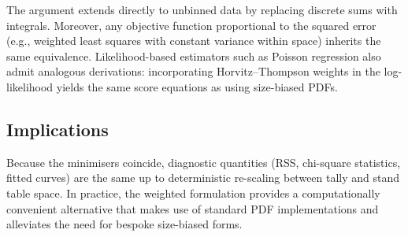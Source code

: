 \documentclass[12pt,letterpaper]{article}
\theoremstyle{plain}
\begin{document}
The argument extends directly to unbinned data by replacing discrete sums with
integrals. Moreover, any objective function proportional to the squared error
(e.g., weighted least squares with constant variance within space) inherits the
same equivalence. Likelihood-based estimators such as Poisson regression also
admit analogous derivations: incorporating Horvitz--Thompson weights in the log-
likelihood yields the same score equations as using size-biased PDFs.

\subsection*{Implications}

Because the minimisers coincide, diagnostic quantities (RSS, chi-square
statistics, fitted curves) are the same up to deterministic re-scaling between
tally and stand table space. In practice, the weighted formulation provides a
computationally convenient alternative that makes use of standard PDF
implementations and alleviates the need for bespoke size-biased forms.



\end{document}
